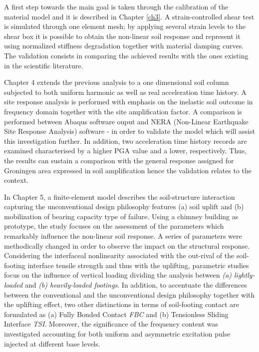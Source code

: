 \documentclass[11pt,a4paper]{report}
\begin{document}
A first step towards the main goal is taken through the calibration of the material model and it is described in Chapter \ref{ch3}. A strain-controlled shear test is simulated through one element mesh;  by applying several strain levels to the shear box it is possible to obtain the non-linear soil response and represent it using normalized stiffness degradation together with material damping curves. The validation consists in comparing the achieved results with the ones existing in the scientific literature.

Chapter 4 extends the previous analysis to a one dimensional soil column subjected to both uniform harmonic as well as real acceleration time history. A site response analysis is performed with emphasis on the inelastic soil outcome in frequency domain together with the site amplification factor. A comparison is performed between Abaqus software ouput and NERA (Non-Linear Earthquake Site Response Analysis) software - in order to validate the model which will assist this investigation further.  In addition, two acceleration time history records  are examined characterised by a higher PGA value and a lower, respectively. Thus, the results can sustain a comparison with the general response assigned for Groningen area expressed in soil amplification hence the validation relates to the context.

In Chapter 5, a finite-element model describes the soil-structure interaction capturing the unconventional design philosophy features (a) soil uplift and (b) mobilization of bearing capacity type of failure. Using a chimney building as prototype, the study focuses on the assessment of the parameters which remarkably influence the non-linear soil response. A series of parameters were methodically changed in order to observe the impact on the structural response. Considering the interfaceal nonlinearity associated with the out-rival of the soil-footing interface tensile strength and thus with the uplifting, parametric studies focus on the influence of vertical loading dividing the analysis between \textit{(a) lightly-loaded} and \textit{(b) heavily-loaded footings}. In addition, to accentuate the differences between the conventional and the unconventional design philosophy together with the uplifting effect, two other distinctions in terms of soil-footing contact are formulated as (a) Fully Bonded Contact \textit{FBC} and (b) Tensionless Sliding Interface \textit{TSI}. Moreover, the significance of the frequency content was investigated accounting for both uniform and asymmetric excitation pulse injected at different base levels. 
\end{document}
